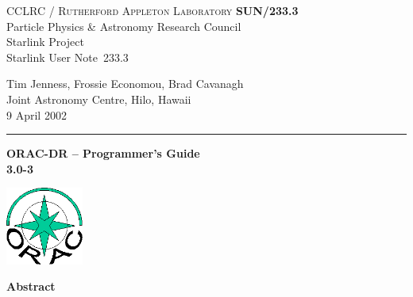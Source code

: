 \documentclass[twoside,11pt]{article}
\newcommand{\stardoccategory}  {Starlink User Note}
\newcommand{\stardocinitials}  {SUN}
\newcommand{\stardocnumber}    {233.3}
\newcommand{\stardocauthors}   {Tim Jenness, Frossie Economou, Brad Cavanagh\\
Joint Astronomy Centre, Hilo, Hawaii}
\newcommand{\stardocdate}      {9 April 2002}
\newcommand{\stardoctitle}     {ORAC-DR -- Programmer's Guide}
\newcommand{\stardocversion}   {3.0-3}
\newcommand{\stardocmanual}    {}
\newcommand{\stardocname}{\stardocinitials /\stardocnumber}
\newenvironment{latexonly}{}{}
\renewcommand{\_}{\texttt{\symbol{95}}}
\begin{document}
\thispagestyle{empty}

\begin{latexonly}
   CCLRC / \textsc{Rutherford Appleton Laboratory} \hfill \textbf{\stardocname}\\
   {\large Particle Physics \& Astronomy Research Council}\\
   {\large Starlink Project\\}
   {\large \stardoccategory\ \stardocnumber}
   \begin{flushright}
   \stardocauthors\\
   \stardocdate
   \end{flushright}
   \vspace{-4mm}
   \rule{\textwidth}{0.5mm}
   \vspace{5mm}
   \begin{center}
   {\Huge\textbf{\stardoctitle \\ [2.5ex]}}
   {\LARGE\textbf{\stardocversion \\ [4ex]}}
   {\Huge\textbf{\stardocmanual}}
   \end{center}
   \vspace{5mm}

\begin{center}
\includegraphics[width=1.0in]{sun233_logo}
\end{center}

   \vspace{10mm}
   \begin{center}
      {\Large\textbf{Abstract}}
   \end{center}
\end{latexonly}
\end{document}

